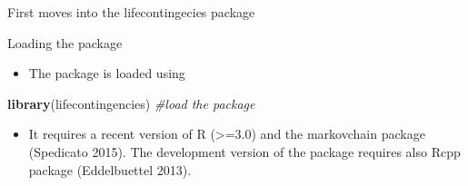 \documentclass[ignorenonframetext,]{beamer}
\newenvironment{Shaded}{\begin{snugshade}}{\end{snugshade}}
\newcommand{\KeywordTok}[1]{\textcolor[rgb]{0.13,0.29,0.53}{\textbf{{#1}}}}
\newcommand{\CommentTok}[1]{\textcolor[rgb]{0.56,0.35,0.01}{\textit{{#1}}}}
\newcommand{\NormalTok}[1]{{#1}}
\begin{document}
\begin{frame}[fragile]{First moves into the lifecontingecies package}

\begin{block}{Loading the package}

\begin{itemize}[<+->]
\itemsep1pt\parskip0pt
\item
  The package is loaded using
\end{itemize}

\begin{Shaded}
\begin{Highlighting}[]
\KeywordTok{library}\NormalTok{(lifecontingencies) }\CommentTok{#load the package}
\end{Highlighting}
\end{Shaded}

\begin{itemize}[<+->]
\itemsep1pt\parskip0pt
\item
  It requires a recent version of R (\textgreater{}=3.0) and the
  markovchain package (Spedicato 2015). The development version of the
  package requires also Rcpp package (Eddelbuettel 2013).
\end{itemize}

\end{block}

\end{frame}
\end{document}
